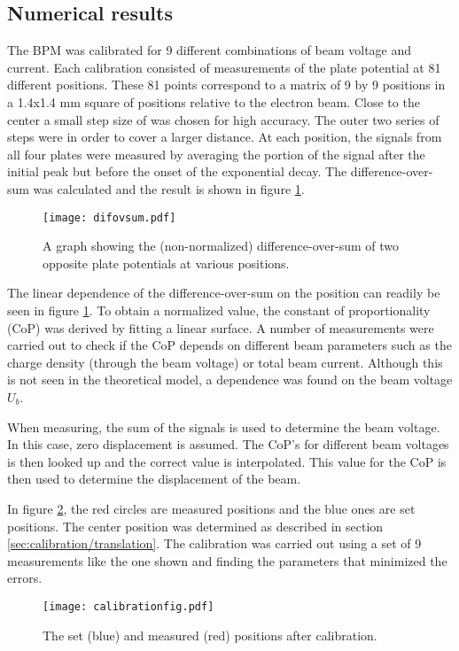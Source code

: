 \subsection{Numerical results}
The BPM was calibrated for 9 different combinations of beam voltage and current. Each calibration consisted of measurements of the plate potential at 81 different positions. These 81 points correspond to a matrix of 9 by 9 positions in a 1.4x1.4 mm square of positions relative to the electron beam. Close to the center a small step size of  was chosen for high accuracy. The outer two series of steps were  in order to cover a larger distance.
At each position, the signals from all four plates were measured by averaging the portion of the signal after the initial peak but before the onset of the exponential decay. The difference-over-sum was calculated and the result is shown in figure \ref{fig:difovsum}.
\begin{figure}[h]
 \centering
 \texttt{[image: difovsum.pdf]}
 \caption{A graph showing the (non-normalized) difference-over-sum of two opposite plate potentials at various positions.}
 \label{fig:difovsum}
\end{figure}

The linear dependence of the difference-over-sum on the position can readily be seen in figure \ref{fig:difovsum}. To obtain a normalized value, the constant of proportionality (CoP) was derived by fitting a linear surface.
A number of measurements were carried out to check if the CoP depends on different beam parameters such as the charge density (through the beam voltage) or total beam current. Although this is not seen in the theoretical model, a dependence was found on the beam voltage $U_b$.

When measuring, the sum of the signals is used to determine the beam voltage. In this case, zero displacement is assumed. The CoP's for different beam voltages is then looked up and the correct value is interpolated. This value for the CoP is then used to determine the displacement of the beam.

In figure \ref{fig:calfig}, the red circles are measured positions and the blue ones are set positions. The center position was determined as described in section \ref{sec:calibration/translation}. The calibration was carried out using a set of 9 measurements like the one shown and finding the parameters that minimized the errors.

\begin{figure}[H]
\centering
\texttt{[image: calibrationfig.pdf]}
\caption{The set (blue) and measured (red) positions after calibration.}
\label{fig:calfig}
\end{figure}
